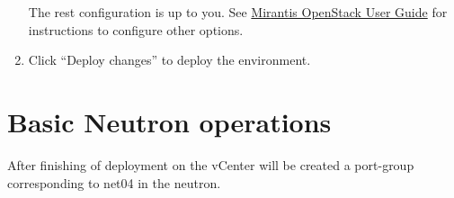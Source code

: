\documentclass{article}
\begin{document}
\begin{enumerate}
The rest configuration is up to you. See \href{https://docs.mirantis.com/openstack/fuel/fuel-6.1/user-guide.html}{Mirantis OpenStack User Guide} for instructions to configure other options.

\item Click ``Deploy changes'' to deploy the environment.

\end{enumerate}

\section{Basic Neutron operations}

After finishing of deployment on the vCenter will be created a port-group corresponding to net04 in the neutron.
\end{document}
